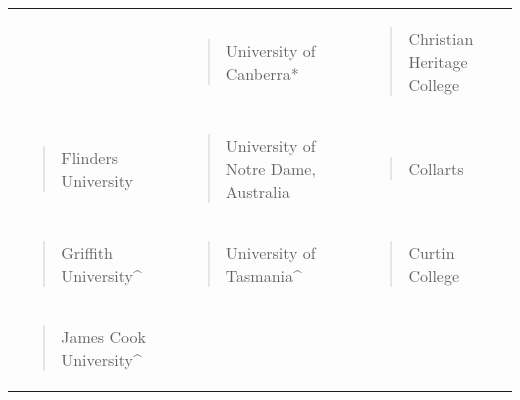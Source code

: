 \documentclass[]{book}
\begin{document}
\begin{longtable}[]{@{}lll@{}}
\begin{minipage}[t]{0.32\columnwidth}
\begin{quote}
\end{quote}\strut
\end{minipage} & \begin{minipage}[t]{0.32\columnwidth}\raggedright
\begin{quote}
University of Canberra*
\end{quote}\strut
\end{minipage} & \begin{minipage}[t]{0.32\columnwidth}\raggedright
\begin{quote}
Christian Heritage College
\end{quote}\strut
\end{minipage}\tabularnewline
\begin{minipage}[t]{0.32\columnwidth}\raggedright
\begin{quote}
Flinders University
\end{quote}\strut
\end{minipage} & \begin{minipage}[t]{0.32\columnwidth}\raggedright
\begin{quote}
University of Notre Dame, Australia
\end{quote}\strut
\end{minipage} & \begin{minipage}[t]{0.32\columnwidth}\raggedright
\begin{quote}
Collarts
\end{quote}\strut
\end{minipage}\tabularnewline
\begin{minipage}[t]{0.32\columnwidth}\raggedright
\begin{quote}
Griffith University\^{}
\end{quote}\strut
\end{minipage} & \begin{minipage}[t]{0.32\columnwidth}\raggedright
\begin{quote}
University of Tasmania\^{}
\end{quote}\strut
\end{minipage} & \begin{minipage}[t]{0.32\columnwidth}\raggedright
\begin{quote}
Curtin College
\end{quote}\strut
\end{minipage}\tabularnewline
\begin{minipage}[t]{0.32\columnwidth}\raggedright
\begin{quote}
James Cook University\^{}
\end{quote}\strut

\end{minipage}
\end{longtable}
\end{document}
